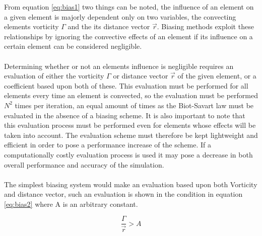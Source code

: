 From equation \ref{eq:bias1} two things can be noted, the influence of an element on a given element is majorly dependent only on two variables, the convecting elements vorticity $\Gamma$ and the its distance vector $\vec{r}$. Biasing methods exploit these relationships by ignoring the convective effects of an element if its influence on a certain element can be considered negligible. 
\\\\
Determining whether or not an elements influence is negligible requires an evaluation of either the vorticity $\Gamma$ or distance vector $\vec{r}$ of the given element, or a coefficient based upon both of these. This evaluation must be performed for all elements every time an element is convected, so the evaluation must be performed $N^2$ times per iteration, an equal amount of times as the Biot-Savart law must be evaluated in the absence of a biasing scheme. It is also important to note that this evaluation process must be performed even for elements whose effects will be taken into account. The evaluation scheme must therefore be kept lightweight and efficient in order to pose a performance increase of the scheme. If a computationally costly evaluation process is used it may pose a decrease in both overall performance and accuracy of the simulation.
\\\\
The simplest biasing system would make an evaluation based upon both Vorticity and distance vector, such an evaluation is shown in the condition in equation \ref{eq:bias2} where A is an arbitrary constant.

\begin{equation}
\label{eq:bias2}
\frac{\Gamma}{\vec{r}}>A
\end{equation}

